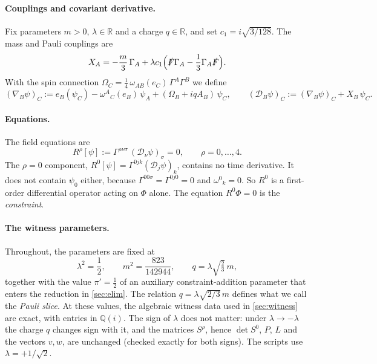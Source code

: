 \documentclass[11pt]{article}
\theoremstyle{plain}
\theoremstyle{definition}
\theoremstyle{remark}
\newcommand{\R}{\mathbb{R}}
\newcommand{\Q}{\mathbb{Q}}
\newcommand{\Dcal}{\mathcal{D}}
\begin{document}
\paragraph{Couplings and covariant derivative.}
Fix parameters $m > 0$, $\lambda \in \R$ and a charge $q \in \R$, and set $c_1 = i\sqrt{3/128}$. The mass and Pauli couplings are
\[
  X_A = -\frac{m}{3}\,\Gamma_A + \lambda c_1\Bigl(\slashed{F}\Gamma_A - \frac13\Gamma_A\slashed{F}\Bigr).
\]
With the spin connection $\Omega_C = \frac14\,\omega_{AB}(e_C)\,\Gamma^A\Gamma^B$ we define
\[
  (\nabla_B\psi)_C := e_B(\psi_C) - \omega^{A}{}_{C}(e_B)\,\psi_A + (\Omega_B + iqA_B)\,\psi_C,
  \qquad
  (\Dcal_B\psi)_C := (\nabla_B\psi)_C + X_B\,\psi_C .
\]

\paragraph{Equations.}
The field equations are
\begin{equation}\label{eq:RS}
  R^\rho[\psi] := \Gamma^{\rho\nu\sigma}\,(\Dcal_\nu\psi)_\sigma = 0, \qquad \rho = 0,\dots,4 .
\end{equation}
The $\rho = 0$ component, $R^0[\psi] = \Gamma^{0jk}(\Dcal_j\psi)_k$, contains no time derivative. It does not contain $\psi_0$ either, because $\Gamma^{00\sigma} = \Gamma^{0j0} = 0$ and $\omega^{0}{}_{k} = 0$. So $R^0$ is a first-order differential operator acting on $\Phi$ alone. The equation $R^0\Phi = 0$ is the \emph{constraint}.

\paragraph{The witness parameters.}
Throughout, the parameters are fixed at
\begin{equation}\label{eq:witness-params}
  \lambda^2 = \frac12,\qquad m^2 = \frac{823}{142944},\qquad q = \lambda\sqrt{\tfrac23}\,m ,
\end{equation}
together with the value $\pi' = \tfrac12$ of an auxiliary constraint-addition parameter that enters the reduction in \cref{sec:elim}. The relation $q = \lambda\sqrt{2/3}\,m$ defines what we call the \emph{Pauli slice}. At these values, the algebraic witness data used in \cref{sec:witness} are exact, with entries in $\Q(i)$. The sign of $\lambda$ does not matter: under $\lambda \to -\lambda$ the charge $q$ changes sign with it, and the matrices $S^\rho$, hence $\det S^0$, $P$, $L$ and the vectors $v,w$, are unchanged (checked exactly for both signs). The scripts use $\lambda = +1/\sqrt2$.
\end{document}

